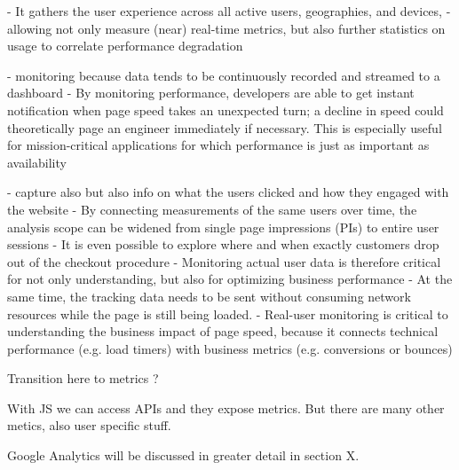 - It gathers the user experience across all active users, geographies, and devices,
- allowing not only measure (near) real-time metrics, but also further statistics on usage to correlate performance degradation



- monitoring because data tends to be continuously recorded and streamed to a dashboard
- By monitoring performance, developers are able to get instant notification when page speed takes an unexpected turn; a decline in speed could theoretically page an engineer immediately if necessary. This is especially useful for mission-critical applications for which performance is just as important as availability





- capture also but also info on what the users clicked and how they engaged with the website
- By connecting measurements of the same users over time, the analysis scope can be widened from single page impressions (PIs) to entire user sessions
- It is even possible to explore where and when exactly customers drop out of the checkout procedure
- Monitoring actual user data is therefore critical for not only understanding, but also for optimizing business performance
- At the same time, the tracking data needs to be sent without consuming network resources while the page is still being loaded. 
- Real-user monitoring is critical to understanding the business impact of page speed, because it connects technical performance (e.g. load timers) with business metrics (e.g. conversions or bounces)






Transition here to metrics ?






With JS we can access APIs and they expose metrics.
But there are many other metics, also user specific stuff.








Google Analytics will be discussed in greater detail in section X.




